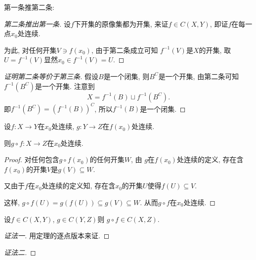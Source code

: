 第一条推第二条: 
% 
% 
% 
% 
% 
% 
% 
\begin{proof}[第二条推出第一条]
    设$f$下开集的原像集都为开集, 来证$f \in C\left( X,Y \right) $, 即证$f$在每一点$x_0$处连续. 
    
    为此, 对任何开集$V \ni f\left( x_0 \right) $, 由于第二条成立可知 $f^{-1}\left( V \right) $是$X$的开集, 取$U = f^{-1} \left( V \right)$显然$x_0 \in f^{-1} \left( V \right)  = U$.
\end{proof}

\begin{proof}[证明第二条等价于第三条]
    假设$B$是一个闭集, 则$B^{C}$是一个开集, 由第二条可知$f^{-1} \left( B^{C} \right) $是一个开集. 注意到
    \begin{equation}
      X = f^{-1} \left( B \right) \sqcup f^{-1} \left( B^{C} \right) .
    \end{equation}
    即$ f^{-1} \left( B^{C} \right) = \left( f^{-1} \left( B \right)  \right) ^{C}$,
    所以$f^{-1} \left( B \right) $是一个闭集.
\end{proof}

\begin{theorem}[连续映射的复合是连续的]
    设$f \colon X \to Y$在$x_0$处连续, $g \colon Y \to Z$在$f\left( x_0 \right) $处连续.
    
    则$g \circ f \colon X \to Z$在$x_0$处连续.
\end{theorem}
\begin{proof}
    对任何包含$g \circ f\left( x_0 \right) $的任何开集$W$, 由 $g$在$f\left( x_0 \right) $处连续的定义, 存在含$f\left( x_0 \right) $的开集$V$是$g\left( V  \right) \subseteq W$.

    又由于$f$在$x_0$处连续的定义知, 存在含$x_0$的开集$U$使得$f\left( U \right) \subseteq V$.

    这样, $g \circ f \left( U \right) = g\left( f\left( U \right)  \right) \subseteq g\left( V \right) \subseteq W$. 从而$g \circ f$在$x_0$处连续.
\end{proof}

\begin{theorem}[映射复合保持连续性]
    设$f \in C\left( X,Y \right) $, $g \in C\left( Y,Z \right) $则 $g \circ f \in C\left( X, Z \right) $.
\end{theorem}
\begin{proof}[证法一]
    用定理的逐点版本来证.
\end{proof}
\begin{proof}[证法二]
\end{proof}

